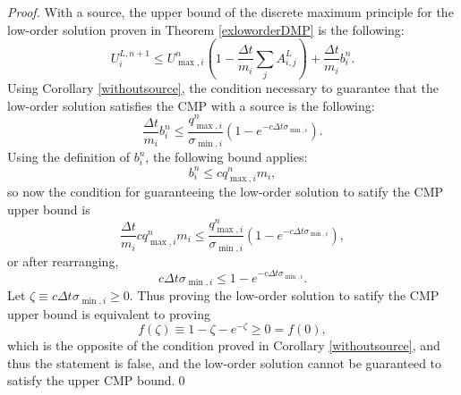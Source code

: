 \begin{proof}
With a source, the upper bound of the discrete maximum principle for the low-order solution
proven in Theorem \ref{exloworderDMP} is the following:
\[
   U_i^{L,n+1}\leq
   U_{\max,i}^n\left(1-\frac{\Delta t}{m_i}\sum\limits_j A^L_{i,j}\right)
   + \frac{\Delta t}{m_i}b_i^n.
\]
Using Corollary \ref{withoutsource}, the condition necessary to guarantee that
the low-order solution satisfies the CMP with a source is the following:
\[
   \frac{\Delta t}{m_i}b_i^n \le \frac{q_{\max,i}^n}{\sigma_{\min,i}}
   (1-e^{-c\Delta t\sigma_{\min,i}}).
\]
Using the definition of $b_i^n$, the following bound applies:
\[
   b_i^n \le c q_{\max,i}^n m_i,
\]
so now the condition for guaranteeing the low-order solution to satify the CMP upper bound is
\[
   \frac{\Delta t}{m_i}c q_{\max,i}^n m_i \le
   \frac{q_{\max,i}^n}{\sigma_{\min,i}}(1-e^{-c\Delta t\sigma_{\min,i}}),
\]
or after rearranging,
\[
   c\Delta t\sigma_{\min,i} \le
   1-e^{-c\Delta t\sigma_{\min,i}}.
\]
Let $\zeta\equiv c\Delta t\sigma_{\min,i}\ge 0$. Thus proving the low-order solution to
satify the CMP upper bound is equivalent to proving
\[
   f(\zeta)\equiv 1-\zeta-e^{-\zeta} \ge 0 = f(0),
\]
which is the opposite of the condition proved in Corollary \ref{withoutsource},
and thus the statement is false, and the low-order solution cannot be
guaranteed to satisfy the upper CMP bound.\qed
\end{proof}